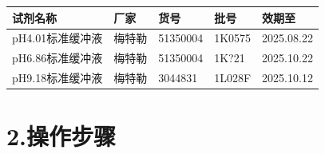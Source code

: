 \documentclass[UTF8,10pt,a4paper,fontset=fandol]{ctexart}
\newcommand{\fieldvalue}[1]{#1}
\newcommand{\handwritten}[1]{#1}
\begin{document}
\begin{tabular}{|p{4.2cm}|p{3cm}|p{3cm}|p{3cm}|p{3cm}|}
\hline
试剂名称 & 厂家 & 货号 & 批号 & 效期至
\\ \hline
\fieldvalue{pH4.01标准缓冲液} &
\fieldvalue{梅特勒} &
\fieldvalue{\handwritten{51350004}} &
\fieldvalue{\handwritten{1K0575}} &
\fieldvalue{\handwritten{2025.08.22}}
\\ \hline
\fieldvalue{pH6.86标准缓冲液} &
\fieldvalue{梅特勒} &
\fieldvalue{\handwritten{51350004}} &
\fieldvalue{\handwritten{1K?21}} &
\fieldvalue{\handwritten{2025.10.22}}
\\ \hline
\fieldvalue{pH9.18标准缓冲液} &
\fieldvalue{梅特勒} &
\fieldvalue{\handwritten{3044831}} &
\fieldvalue{\handwritten{1L028F}} &
\fieldvalue{\handwritten{2025.10.12}}
\\ \hline
\end{tabular}

\section*{2.\quad 操作步骤}
\end{document}
